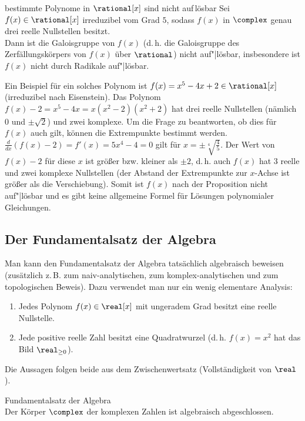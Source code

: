 \linie

\begin{Prop}{bestimmte Polynome in $\rational[x]$ sind nicht auf\,\!lösbar}
    Sei $f(x) \in \rational[x]$ irreduzibel vom Grad $5$, sodass
    $f(x)$ in $\complex$ genau drei reelle Nullstellen besitzt.\\
    Dann ist die Galoisgruppe von $f(x)$
    (d.\,h. die Galoisgruppe des Zerfällungskörpers von $f(x)$ über
    $\rational$)
    nicht auf"|lösbar,
    insbesondere ist $f(x)$ nicht durch Radikale auf"|lösbar.
\end{Prop}

\begin{Bem}
    Ein Beispiel für ein solches Polynom ist
    $f(x) = x^5 - 4x + 2 \in \rational[x]$
    (irreduzibel nach Eisenstein).
    Das Polynom $f(x) - 2 = x^5 - 4x = x(x^2 - 2)(x^2 + 2)$ hat
    drei reelle Nullstellen (nämlich $0$ und $\pm\sqrt{2}$) und
    zwei komplexe.
    Um die Frage zu beantworten, ob dies für $f(x)$ auch gilt, können die
    Extrempunkte bestimmt werden.
    $\frac{d}{dx}(f(x) - 2) = f'(x) = 5x^4 - 4 = 0$ gilt für
    $x = \pm\sqrt[4]{\frac{4}{5}}$.
    Der Wert von $f(x) - 2$ für diese $x$ ist größer bzw. kleiner als
    $\pm 2$,
    d.\,h. auch $f(x)$ hat $3$ reelle und zwei komplexe Nullstellen
    (der Abstand der Extrempunkte zur $x$-Achse ist größer als die
    Verschiebung).
    Somit ist $f(x)$ nach der Proposition nicht auf"|lösbar und
    es gibt keine allgemeine Formel für Lösungen polynomialer Gleichungen.
\end{Bem}

\subsection{%
    Der Fundamentalsatz der Algebra%
}

\begin{Bem}
    Man kann den Fundamentalsatz der Algebra tatsächlich algebraisch beweisen
    (zusätzlich z.\,B. zum naiv-analytischen, zum
    komplex-analytischen und zum topologischen Beweis).
    Dazu verwendet man nur ein wenig elementare Analysis:
    \begin{enumerate}[label=(\alph*)]
        \item
        Jedes Polynom $f(x) \in \real[x]$ mit ungeradem Grad besitzt
        eine reelle Nullstelle.
        
        \item
        Jede positive reelle Zahl besitzt eine Quadratwurzel
        (d.\,h. $f(x) = x^2$ hat das Bild $\real_{\ge 0}$).
    \end{enumerate}
    Die Aussagen folgen beide aus dem Zwischenwertsatz
    (Vollständigkeit von $\real$).
\end{Bem}

\begin{Theorem}{Fundamentalsatz der Algebra}\\
    Der Körper $\complex$ der komplexen Zahlen ist algebraisch abgeschlossen.
\end{Theorem}

\pagebreak
